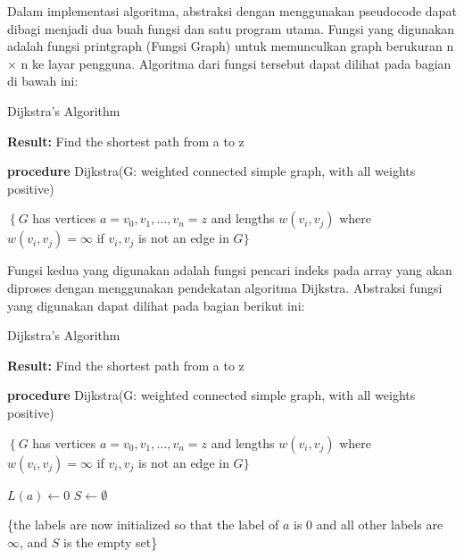 \documentclass[10pt]{IEEEtran}
\begin{document}
Dalam implementasi algoritma, abstraksi dengan menggunakan pseudocode dapat dibagi 
menjadi dua buah fungsi dan satu program utama. Fungsi yang digunakan adalah fungsi
printgraph (Fungsi Graph) untuk memunculkan graph berukuran n × n ke layar pengguna. 
Algoritma dari fungsi tersebut
dapat dilihat pada bagian di bawah ini:

\begin{algorithm}

\caption{Dijkstra’s Algorithm}
\label{alg:two}

\textbf{Result:} Find the shortest path from a to $\mathrm{z}$

\textbf{procedure} Dijkstra(G: weighted connected simple graph, with all weights positive)

$\left\{G\right.$ has vertices $a=v_{0}, v_{1}, \ldots, v_{n}=z$ and lengths $w\left(v_{i}, v_{j}\right)$ where $w\left(v_{i}, v_{j}\right)=\infty$ if $v_{i}, v_{j}$ is not an edge in $G\}$

\end{algorithm}

Fungsi kedua yang digunakan adalah fungsi pencari indeks
pada array yang akan diproses dengan menggunakan pendekatan algoritma Dijkstra. 
Abstraksi fungsi yang digunakan
dapat dilihat pada bagian berikut ini:

\begin{algorithm}

\caption{Dijkstra’s Algorithm}
\label{alg:two}

\textbf{Result:} Find the shortest path from a to $\mathrm{z}$

\textbf{procedure} Dijkstra(G: weighted connected simple graph, with all weights positive)

$\left\{G\right.$ has vertices $a=v_{0}, v_{1}, \ldots, v_{n}=z$ and lengths $w\left(v_{i}, v_{j}\right)$ where $w\left(v_{i}, v_{j}\right)=\infty$ if $v_{i}, v_{j}$ is not an edge in $G\}$

$L(a)\gets0$
$S\gets\emptyset$

\{the labels are now initialized so that the label of $a$ is
0 and all other labels are $\infty$, and $S$ is the empty set\}
\end{algorithm}
\end{document}
